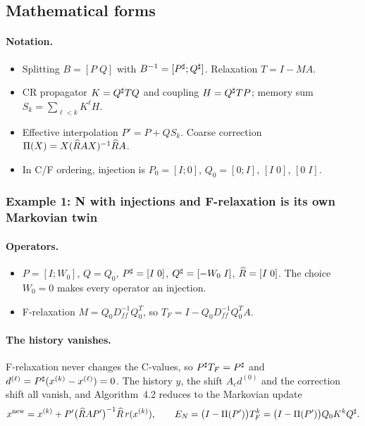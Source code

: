 \subsection{Mathematical forms}\label{sec:num-forms}

\paragraph{Notation.}
\begin{itemize}
  \item Splitting $B=[P\;Q]$ with $B^{-1}=[P^{\sharp};Q^{\sharp}]$. Relaxation $T=I-MA$.
  \item CR propagator $K=Q^{\sharp} TQ$ and coupling $H=Q^{\sharp} TP$; memory sum $S_k=\sum_{\ell<k}K^\ell H$.
  \item Effective interpolation $P'=P+QS_k$. Coarse correction $\Pi(X)=X(\widehat R AX)^{-1}\widehat R A$.
  \item In C/F ordering, injection is $P_0=[I;0]$, $Q_0=[0;I]$, $[I\;0]$, $[0\;I]$.
\end{itemize}

\subsubsection{Example 1: N with injections and F-relaxation is its own Markovian twin}\label{sec:form-twin}

\paragraph{Operators.}
\begin{itemize}
  \item $P=[I;W_0]$, $Q=Q_0$, $P^{\sharp}=[I\;0]$, $Q^{\sharp}=[-W_0\;I]$, $\widehat R=[I\;0]$. The choice $W_0=0$ makes every operator
    an injection.
  \item F-relaxation $M=Q_0D_{ff}^{-1}Q_0^T$, so $T_F=I-Q_0D_{ff}^{-1}Q_0^TA$.
\end{itemize}

\paragraph{The history vanishes.}
F-relaxation never changes the C-values, so $P^{\sharp} T_F=P^{\sharp}$ and $d^{(\ell)}=P^{\sharp}(x^{(k)}-x^{(\ell)})=0$. The history
$y$, the shift $A_cd^{(0)}$ and the correction shift all vanish, and Algorithm~4.2 reduces to the Markovian update
\begin{equation}\label{eq:twin-update}
  x^{\mathrm{new}}=x^{(k)}+P'\bigl(\widehat R AP'\bigr)^{-1}\widehat R\, r(x^{(k)}),\qquad
  E_N=\bigl(I-\Pi(P')\bigr)T_F^k=\bigl(I-\Pi(P')\bigr)Q_0K^kQ^{\sharp} .
\end{equation}

